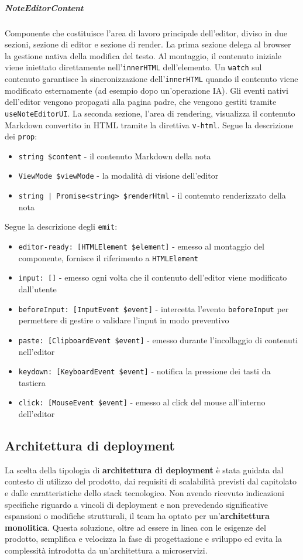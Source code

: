 \documentclass[a4paper,10pt]{article}
\begin{document}
\subparagraph{NoteEditorContent} Componente che costituisce l'area di lavoro principale dell'editor, diviso in due sezioni, sezione di editor e sezione di render. La prima sezione delega al browser la gestione nativa della modifica del testo. Al montaggio, il contenuto iniziale viene iniettato direttamente nell'\texttt{innerHTML} dell'elemento. Un \texttt{watch} sul contenuto garantisce la sincronizzazione dell'\texttt{innerHTML} quando il contenuto viene modificato esternamente (ad esempio dopo un'operazione IA). Gli eventi nativi dell'editor vengono propagati alla pagina padre, che vengono gestiti tramite \texttt{useNoteEditorUI}. La seconda sezione, l'area di rendering, visualizza il contenuto Markdown convertito in HTML tramite la direttiva \texttt{v-html}.  Segue la descrizione dei \texttt{prop}:
\begin{itemize}
    \item \texttt{string \$content} - il contenuto Markdown della nota
    \item \texttt{ViewMode \$viewMode} - la modalità di visione dell'editor
    \item \texttt{string | Promise<string> \$renderHtml} - il contenuto renderizzato della nota
\end{itemize}
Segue la descrizione degli \texttt{emit}:
\begin{itemize}
    \item \texttt{editor-ready: [HTMLElement \$element]} - emesso al montaggio del componente, fornisce il riferimento a \texttt{HTMLElement}
    \item \texttt{input: []} - emesso ogni volta che il contenuto dell'editor viene modificato dall'utente
    \item \texttt{beforeInput: [InputEvent \$event]} - intercetta l'evento \texttt{beforeInput} per permettere di gestire o validare l'input in modo preventivo
    \item \texttt{paste: [ClipboardEvent \$event]} - emesso durante l'incollaggio di contenuti nell'editor
    \item \texttt{keydown: [KeyboardEvent \$event]} - notifica la pressione dei tasti da tastiera
    \item \texttt{click: [MouseEvent \$event]} - emesso al click del mouse all'interno dell'editor
\end{itemize}

\subsection{Architettura di deployment}
La scelta della tipologia di \textbf{architettura di deployment} è stata guidata dal contesto di utilizzo del prodotto, dai requisiti di scalabilità previsti dal capitolato e dalle caratteristiche dello stack tecnologico.
Non avendo ricevuto indicazioni specifiche riguardo a vincoli di deployment e non prevedendo significative espansioni o modifiche strutturali, il team ha optato per un'\textbf{architettura monolitica}. Questa soluzione, oltre ad essere in linea con le esigenze del prodotto, semplifica e velocizza la fase di progettazione e sviluppo ed evita la complessità introdotta da un'architettura a microservizi.
\end{document}
